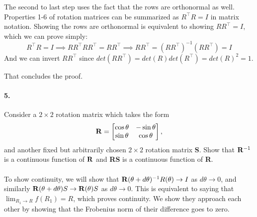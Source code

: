 \documentclass[english]{article}
\begin{document}
The second to last step uses the fact that the rows are orthonormal as well. Properties 1-6 of rotation matrices can be summarized as $R^\top R = I$ in matrix notation. Showing the rows are orthonormal is equivalent to showing $R R^\top = I$, which we can prove simply:
\[ R^\top R = I \implies R R^\top R R^\top = R R^\top \implies R R^\top = (R R^\top)^{-1}(R R^\top)  = I \]
And we can invert $R R^\top$ since $det(R R^\top) = det(R) det(R^\top) = det(R)^2 = 1$.

That concludes the proof.

\paragraph{5.}

Consider a $2 \times 2$ rotation matrix which takes the form
\[
{\bf R} = \begin{bmatrix} \cos \theta & -\sin \theta  \\
\sin \theta  & \cos \theta \end{bmatrix}, 
\]
and another fixed but arbitrarily chosen $2 \times 2$ rotation matrix {\bf S}. 
Show that ${\bf R}^{-1}$ is a continuous function of ${\bf R}$ and {\bf RS} is a continuous function of {\bf R}. 

\paragraph{ }

To show continuity, we will show that  ${\bf R}(\theta + d\theta)^{-1}R(\theta) \rightarrow I$ as $d\theta \rightarrow 0$, and similarly ${\bf R}(\theta + d\theta)S \rightarrow {\bf R}(\theta)S$ as $d\theta \rightarrow 0$. This is equivalent to saying that $ \lim_{R_1 \rightarrow R} f(R_1) = R$, which proves continuity. We show they approach each other by showing that the Frobenius norm of their difference goes to zero.
\end{document}
